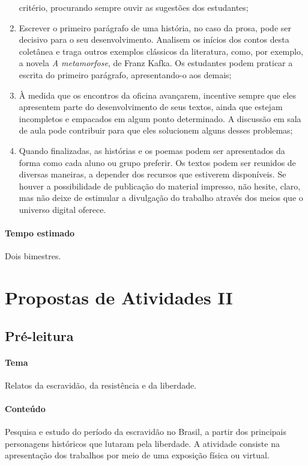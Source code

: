 \documentclass[12pt]{extarticle}
\begin{document}
\begin{enumerate}
  critério, procurando sempre ouvir as sugestões dos estudantes;
\item
  Escrever o primeiro parágrafo de uma história, no caso da prosa, pode
  ser decisivo para o seu desenvolvimento. Analisem os inícios dos
  contos desta coletânea e traga outros exemplos clássicos da
  literatura, como, por exemplo, a novela \emph{A metamorfose}, de Franz
  Kafka. Os estudantes podem praticar a escrita do primeiro parágrafo,
  apresentando-o aos demais;
\item
  À medida que os encontros da oficina avançarem, incentive sempre que
  eles apresentem parte do desenvolvimento de seus textos, ainda que
  estejam incompletos e empacados em algum ponto determinado. A
  discussão em sala de aula pode contribuir para que eles solucionem
  alguns desses problemas;
\item
  Quando finalizadas, as histórias e os poemas podem ser apresentados da
  forma como cada aluno ou grupo preferir. Os textos podem ser reunidos
  de diversas maneiras, a depender dos recursos que estiverem
  disponíveis. Se houver a possibilidade de publicação do material
  impresso, não hesite, claro, mas não deixe de estimular a divulgação
  do trabalho através dos meios que o universo digital oferece.
\end{enumerate}

\paragraph{Tempo estimado} Dois bimestres.

\section{Propostas de Atividades II}

\subsection{Pré-leitura}

\paragraph{Tema} Relatos da escravidão, da resistência e da liberdade.
  
\paragraph{Conteúdo} Pesquisa e estudo do período da escravidão no Brasil,
a partir dos principais personagens históricos que lutaram pela
liberdade. A atividade consiste na apresentação dos trabalhos por meio
de uma exposição física ou virtual.
\end{document}
